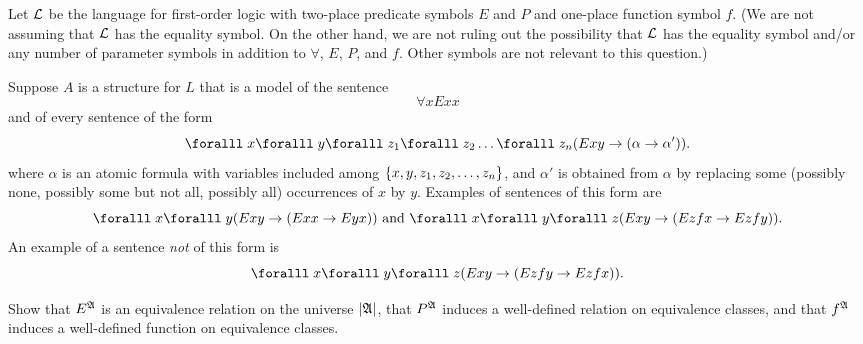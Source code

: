 \begin{problem}
  Let $\mathcal{L}$ be the language for first-order logic with two-place
  predicate symbols $E$ and $P$ and one-place function symbol $f$.
  (We are not assuming that $\mathcal{L}$ has the equality symbol.
  On the other hand, we are not ruling out the possibility that
  $\mathcal{L}$ has the equality symbol and/or any number of parameter symbols
  in addition to $\forall$, $E$, $P$, and $f$.
  Other symbols are not relevant to this question.)

  \step
  Suppose $A$ is a structure for $L$ that is a model of the sentence
  \[ \forall xExx \]
  and of every sentence of the form
  \[
    \forall x \forall y \forall z_1 \forall z_2 \ldots \forall z_n
    (Exy \lto (\alpha \lto \alpha')).
  \]
  where $\alpha$ is an atomic formula with variables included among
  $\left\{x,y,z_1,z_2,\ldots,z_n\right\}$, and $\alpha'$ is
  obtained from $\alpha$ by replacing some
  (possibly none, possibly some but not all, possibly all)
  occurrences of $x$ by $y$.
  Examples of sentences of this form are
  \[ \forall x \forall y (Exy \lto (Exx \lto Eyx))
  \text{ and }
  \forall x \forall y \forall z (Exy \lto (Ez fx \lto Ez fy)).
  \]
  An example of a sentence \emph{not} of this form is
  \[
    \forall x \forall y \forall z (Exy \lto (Ez fy \lto Ez fx)).
  \]

  \step
  Show that $E^{\mathfrak{A}}$ is an equivalence relation on the universe $\lvert\mathfrak{A}\rvert$,
  that $P^{\mathfrak{A}}$ induces a well-defined relation on equivalence classes, and that $f^{\mathfrak{A}}$
  induces a well-defined function on equivalence classes.
\end{problem}
